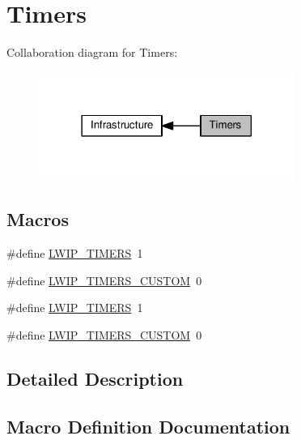 \hypertarget{group__lwip__opts__timers}{}\section{Timers}
\label{group__lwip__opts__timers}
Collaboration diagram for Timers\+:
\nopagebreak
\begin{figure}[H]
\begin{center}
\leavevmode
\includegraphics[width=237pt]{group__lwip__opts__timers}
\end{center}
\end{figure}
\subsection*{Macros}
\begin{DoxyCompactItemize}
\item 
\#define \hyperlink{group__lwip__opts__timers_ga25a41610055f91cbd0960256240b8f2c}{L\+W\+I\+P\+\_\+\+T\+I\+M\+E\+RS}~1
\item 
\#define \hyperlink{group__lwip__opts__timers_gaff0ea56f3e3d8e86c49b50557bc13815}{L\+W\+I\+P\+\_\+\+T\+I\+M\+E\+R\+S\+\_\+\+C\+U\+S\+T\+OM}~0
\item 
\#define \hyperlink{group__lwip__opts__timers_ga25a41610055f91cbd0960256240b8f2c}{L\+W\+I\+P\+\_\+\+T\+I\+M\+E\+RS}~1
\item 
\#define \hyperlink{group__lwip__opts__timers_gaff0ea56f3e3d8e86c49b50557bc13815}{L\+W\+I\+P\+\_\+\+T\+I\+M\+E\+R\+S\+\_\+\+C\+U\+S\+T\+OM}~0
\end{DoxyCompactItemize}


\subsection{Detailed Description}


\subsection{Macro Definition Documentation}
\mbox{\label{group__lwip__opts__timers_ga25a41610055f91cbd0960256240b8f2c}} 

